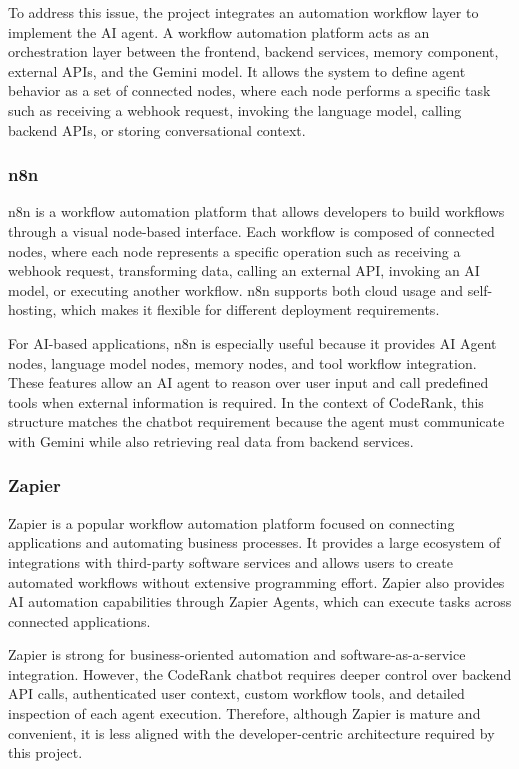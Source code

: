 To address this issue, the project integrates an automation workflow layer to implement the AI agent. A workflow automation platform acts as an orchestration layer between the frontend, backend services, memory component, external APIs, and the Gemini model. It allows the system to define agent behavior as a set of connected nodes, where each node performs a specific task such as receiving a webhook request, invoking the language model, calling backend APIs, or storing conversational context.

\subsubsection{n8n}

n8n is a workflow automation platform that allows developers to build workflows through a visual node-based interface. Each workflow is composed of connected nodes, where each node represents a specific operation such as receiving a webhook request, transforming data, calling an external API, invoking an AI model, or executing another workflow. n8n supports both cloud usage and self-hosting, which makes it flexible for different deployment requirements.\cite{n8n}

For AI-based applications, n8n is especially useful because it provides AI Agent nodes, language model nodes, memory nodes, and tool workflow integration. These features allow an AI agent to reason over user input and call predefined tools when external information is required. In the context of CodeRank, this structure matches the chatbot requirement because the agent must communicate with Gemini while also retrieving real data from backend services.

\subsubsection{Zapier}

Zapier is a popular workflow automation platform focused on connecting applications and automating business processes. It provides a large ecosystem of integrations with third-party software services and allows users to create automated workflows without extensive programming effort. Zapier also provides AI automation capabilities through Zapier Agents, which can execute tasks across connected applications.\cite{zapier_agents}

Zapier is strong for business-oriented automation and software-as-a-service integration. However, the CodeRank chatbot requires deeper control over backend API calls, authenticated user context, custom workflow tools, and detailed inspection of each agent execution. Therefore, although Zapier is mature and convenient, it is less aligned with the developer-centric architecture required by this project.

